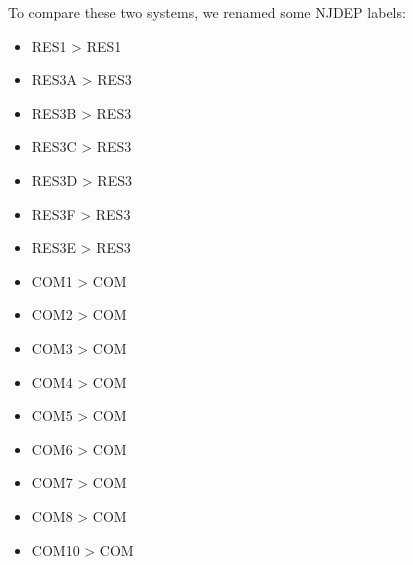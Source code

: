 \documentclass[letterpaper,10pt,english]{sphinxmanual}
\begin{document}
\sphinxAtStartPar
To compare these two systems, we renamed some NJDEP labels:
\begin{itemize}
\item {} 
\sphinxAtStartPar
RES1  \sphinxhyphen{}\textgreater{} RES1

\item {} 
\sphinxAtStartPar
RES3A \sphinxhyphen{}\textgreater{} RES3

\item {} 
\sphinxAtStartPar
RES3B \sphinxhyphen{}\textgreater{} RES3

\item {} 
\sphinxAtStartPar
RES3C \sphinxhyphen{}\textgreater{} RES3

\item {} 
\sphinxAtStartPar
RES3D \sphinxhyphen{}\textgreater{} RES3

\item {} 
\sphinxAtStartPar
RES3F \sphinxhyphen{}\textgreater{} RES3

\item {} 
\sphinxAtStartPar
RES3E \sphinxhyphen{}\textgreater{} RES3

\item {} 
\sphinxAtStartPar
COM1  \sphinxhyphen{}\textgreater{} COM

\item {} 
\sphinxAtStartPar
COM2  \sphinxhyphen{}\textgreater{} COM

\item {} 
\sphinxAtStartPar
COM3  \sphinxhyphen{}\textgreater{} COM

\item {} 
\sphinxAtStartPar
COM4  \sphinxhyphen{}\textgreater{} COM

\item {} 
\sphinxAtStartPar
COM5  \sphinxhyphen{}\textgreater{} COM

\item {} 
\sphinxAtStartPar
COM6  \sphinxhyphen{}\textgreater{} COM

\item {} 
\sphinxAtStartPar
COM7  \sphinxhyphen{}\textgreater{} COM

\item {} 
\sphinxAtStartPar
COM8  \sphinxhyphen{}\textgreater{} COM

\item {} 
\sphinxAtStartPar
COM10 \sphinxhyphen{}\textgreater{} COM

\end{itemize}
\end{document}
